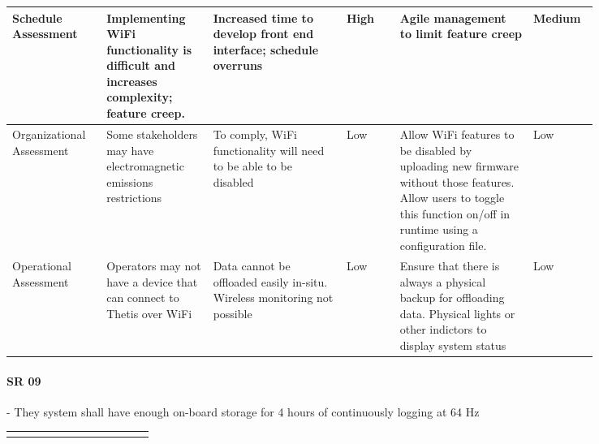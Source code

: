 \begin{landscape}
{\begin{longtable}{| p{0.12\linewidth} | p{0.16\linewidth} |  p{0.20\linewidth} | p{0.08\linewidth} | p{0.20\linewidth} | p{0.08\linewidth} |}
	\hline
	Schedule \newline Assessment & Implementing WiFi functionality is difficult and increases complexity; feature creep. & Increased time to develop front end interface; schedule overruns & \cellcolor{red} High & Agile management to limit feature creep & \cellcolor{yellow} Medium \\
	\hline
	Organizational \newline Assessment & Some stakeholders may have electromagnetic emissions restrictions & To comply, WiFi functionality will need to be able to be disabled & \cellcolor{green} Low & Allow WiFi features to be disabled by uploading new firmware without those features. \newline Allow users to toggle this function on/off in runtime using a configuration file. & \cellcolor{green} Low \\
	\hline
	Operational \newline Assessment & Operators may not have a device that can connect to Thetis over WiFi & Data cannot be offloaded easily in-situ. \newline Wireless monitoring not possible & \cellcolor{green} Low & Ensure that there is always a physical backup for offloading data. \newline Physical lights or other indictors to display system status & \cellcolor{green} Low
	\label{tab:sr08_feasibility}
\end{longtable}
}
\newpage




\paragraph*{SR 09} - They system shall have enough on-board storage for 4 hours of continuously logging at 64 Hz

{\fontsize{8pt}{8pt}\selectfont
\begin{longtable}{| p{0.12\linewidth} | p{0.16\linewidth} |  p{0.20\linewidth} | p{0.08\linewidth} | p{0.20\linewidth} | p{0.08\linewidth} |}
	\hline \endlastfoot
	

\end{longtable}}
\end{landscape}
